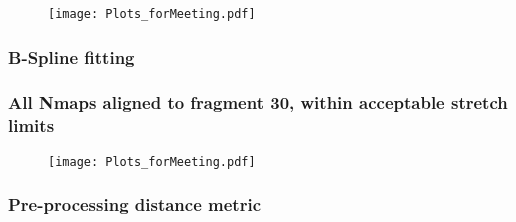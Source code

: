 \documentclass[10pt,dvipsnames,table]{beamer}
\begin{document}
\begin{frame}
\begin{figure}
\texttt{[image: Plots\_forMeeting.pdf]}
\end{figure}
\end{frame}

\begin{frame}
\frametitle{B-Spline fitting}

\end{frame}

\begin{frame}
\frametitle{All Nmaps aligned to fragment 30, within acceptable stretch limits}
\begin{figure}
\texttt{[image: Plots\_forMeeting.pdf]}
\end{figure}
\end{frame}

\begin{frame}
\frametitle{Pre-processing distance metric}

\end{frame}
\end{document}
